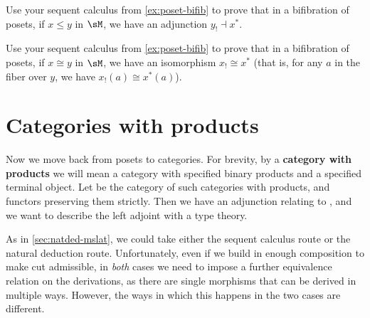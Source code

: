 \documentclass{book}
\begin{document}
\begin{ex}\label{ex:poset-bifib-adj}
  Use your sequent calculus from \cref{ex:poset-bifib} to prove that in a bifibration of posets, if $x\le y$ in $\sM$, we have an adjunction $y_! \dashv x^*$.
\end{ex}

\begin{ex}\label{ex:poset-bifib-iso}
  Use your sequent calculus from \cref{ex:poset-bifib} to prove that in a bifibration of posets, if $x\cong y$ in $\sM$, we have an isomorphism $x_! \cong x^*$ (that is, for any $a$ in the fiber over $y$, we have $x_!(a) \cong x^*(a)$).
\end{ex}


\section{Categories with products}
\label{sec:catprod}\label{sec:beta-eta}

Now we move back from posets to categories.
For brevity, by a \textbf{category with products} we will mean a category with specified binary products and a specified terminal object.
Let \bPrCat be the category of such categories with products, and functors preserving them strictly.
Then we have an adjunction relating \bPrCat to \bGr, and we want to describe the left adjoint with a type theory.

As in \cref{sec:natded-mslat}, we could take either the sequent calculus route or the natural deduction route.
Unfortunately, even if we build in enough composition to make cut admissible, in \emph{both} cases we need to impose a further equivalence relation on the derivations, as there are single morphisms that can be derived in multiple ways.
However, the ways in which this happens in the two cases are different.
\end{document}
